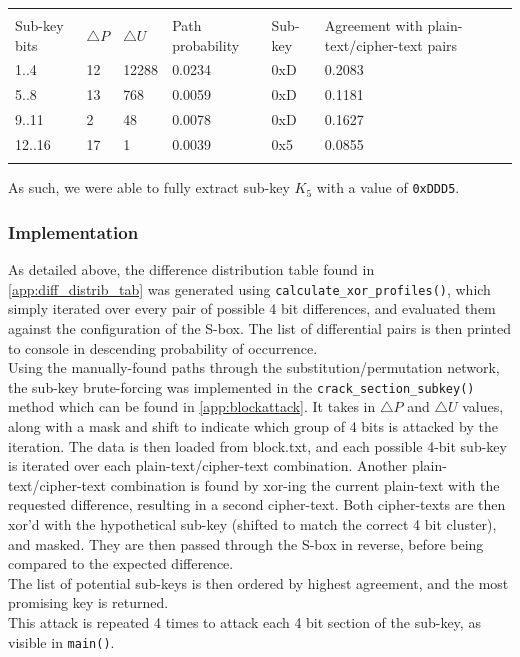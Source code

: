 \documentclass[british,11pt,a4paper]{article}
\begin{document}
\begin{center}
	\begin{tabular}{llllll}\label{tab:pathprobabilities} \\
		\toprule \\
		Sub-key bits & $\triangle P$ & $\triangle U$ & Path probability &  Sub-key & Agreement with plain-text/cipher-text pairs\\
		1..4 & 12 & 12288 & 0.0234 & 0xD & 0.2083\\ 
		5..8 & 13 & 768 & 0.0059 & 0xD & 0.1181\\ 
		9..11 & 2 & 48 & 0.0078 & 0xD & 0.1627\\
		12..16 & 17 & 1 & 0.0039 & 0x5 & 0.0855\\ 
		\bottomrule \\
	\end{tabular}
\end{center}
As such, we were able to fully extract sub-key \(K_5\) with a value of \lstinline{0xDDD5}.
\subsubsection{Implementation}
As detailed above, the difference distribution table found in \autoref{app:diff_distrib_tab} was generated using \lstinline{calculate_xor_profiles()}, which simply iterated over every pair of possible 4 bit differences, and evaluated them against the configuration of the S-box. The list of differential pairs is then printed to console in descending probability of occurrence.
\\
Using the manually-found paths through the substitution/permutation network, the sub-key brute-forcing was implemented in the \lstinline{crack_section_subkey()} method which can be found in \autoref{app:blockattack}. It takes in $\triangle P$ and $\triangle U$ values, along with a mask and shift to indicate which group of 4 bits is attacked by the iteration. The data is then loaded from block.txt, and each possible 4-bit sub-key is iterated over each plain-text/cipher-text combination. Another plain-text/cipher-text combination is found by xor-ing the current plain-text with the requested difference, resulting in a second cipher-text. Both cipher-texts are then xor'd with the hypothetical sub-key (shifted to match the correct 4 bit cluster), and masked. They are then passed through the S-box in reverse, before being compared to the expected difference. 
\\
The list of potential sub-keys is then ordered by highest agreement, and the most promising key is returned.
\\
This attack is repeated 4 times to attack each 4 bit section of the sub-key, as visible in \lstinline{main()}.
\end{document}

